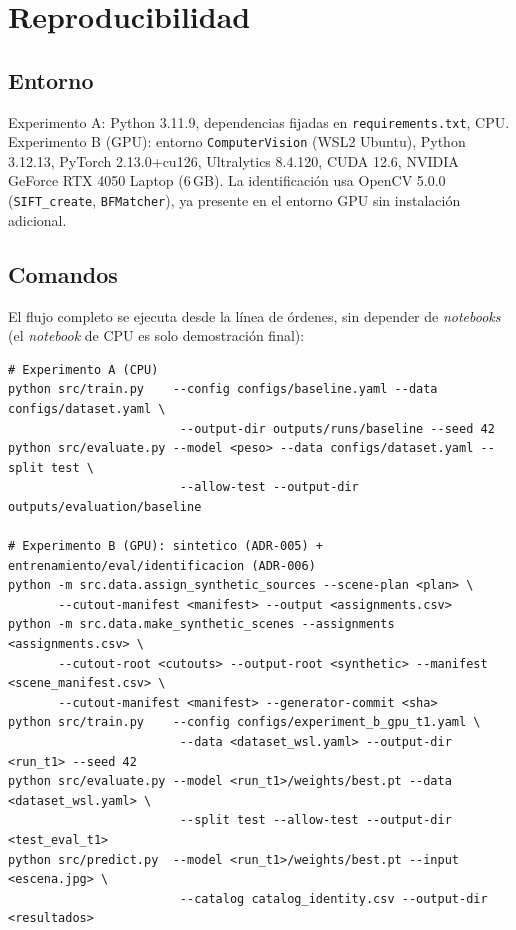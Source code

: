 \documentclass[10pt,a4paper]{article}
\begin{document}
\section{Reproducibilidad}

\subsection{Entorno}

Experimento A: Python 3.11.9, dependencias fijadas en \texttt{requirements.txt},
CPU. Experimento B (GPU): entorno \texttt{ComputerVision} (WSL2 Ubuntu),
Python 3.12.13, PyTorch 2.13.0+cu126, Ultralytics 8.4.120, CUDA 12.6, NVIDIA
GeForce RTX 4050 Laptop (6\,GB). La identificación usa OpenCV 5.0.0
(\texttt{SIFT\_create}, \texttt{BFMatcher}), ya presente en el entorno GPU sin
instalación adicional.

\subsection{Comandos}

El flujo completo se ejecuta desde la línea de órdenes, sin depender de
\emph{notebooks} (el \emph{notebook} de CPU es solo demostración final):

{\small\begin{verbatim}
# Experimento A (CPU)
python src/train.py    --config configs/baseline.yaml --data configs/dataset.yaml \
                        --output-dir outputs/runs/baseline --seed 42
python src/evaluate.py --model <peso> --data configs/dataset.yaml --split test \
                        --allow-test --output-dir outputs/evaluation/baseline

# Experimento B (GPU): sintetico (ADR-005) + entrenamiento/eval/identificacion (ADR-006)
python -m src.data.assign_synthetic_sources --scene-plan <plan> \
       --cutout-manifest <manifest> --output <assignments.csv>
python -m src.data.make_synthetic_scenes --assignments <assignments.csv> \
       --cutout-root <cutouts> --output-root <synthetic> --manifest <scene_manifest.csv> \
       --cutout-manifest <manifest> --generator-commit <sha>
python src/train.py    --config configs/experiment_b_gpu_t1.yaml \
                        --data <dataset_wsl.yaml> --output-dir <run_t1> --seed 42
python src/evaluate.py --model <run_t1>/weights/best.pt --data <dataset_wsl.yaml> \
                        --split test --allow-test --output-dir <test_eval_t1>
python src/predict.py  --model <run_t1>/weights/best.pt --input <escena.jpg> \
                        --catalog catalog_identity.csv --output-dir <resultados>
\end{verbatim}}
\end{document}
